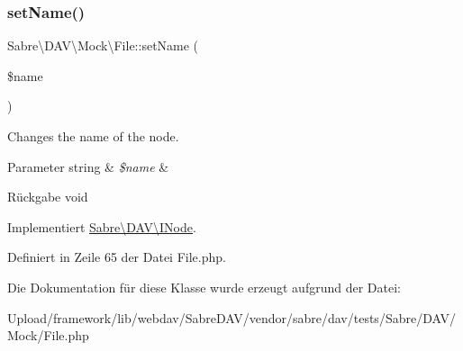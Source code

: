 \subsubsection{\texorpdfstring{set\+Name()}{setName()}}
{\footnotesize\ttfamily Sabre\textbackslash{}\+D\+A\+V\textbackslash{}\+Mock\textbackslash{}\+File\+::set\+Name (\begin{DoxyParamCaption}\item[{}]{\$name }\end{DoxyParamCaption})}

Changes the name of the node.


\begin{DoxyParams}[1]{Parameter}
string & {\em \$name} & \\
\hline
\end{DoxyParams}
\begin{DoxyReturn}{Rückgabe}
void 
\end{DoxyReturn}


Implementiert \mbox{\hyperlink{interface_sabre_1_1_d_a_v_1_1_i_node_ac90fa5526e98def2e1f51bc57a772366}{Sabre\textbackslash{}\+D\+A\+V\textbackslash{}\+I\+Node}}.



Definiert in Zeile 65 der Datei File.\+php.



Die Dokumentation für diese Klasse wurde erzeugt aufgrund der Datei\+:\begin{DoxyCompactItemize}
\item 
Upload/framework/lib/webdav/\+Sabre\+D\+A\+V/vendor/sabre/dav/tests/\+Sabre/\+D\+A\+V/\+Mock/File.\+php\end{DoxyCompactItemize}

